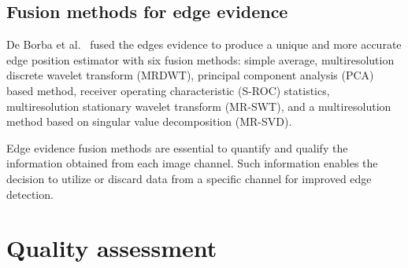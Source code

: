 \documentclass{article}
\begin{document}
\subsection{Fusion methods for edge evidence}
De Borba et al.~\cite{DeBorba2020,FeatureSelectionforEdgeDetectioninPolSARImages} fused the edges evidence to produce a unique and more accurate edge position estimator with six fusion methods: simple average, multiresolution discrete wavelet transform (MRDWT), principal component analysis (PCA) based method, receiver operating characteristic (S-ROC) statistics, multiresolution stationary wavelet transform (MR-SWT), and a multiresolution method based on singular value decomposition (MR-SVD).

Edge evidence fusion methods are essential to quantify and qualify the information obtained from each image channel. 
Such information enables the decision to utilize or discard data from a specific channel for improved edge detection.

\section{Quality assessment}\label{sec_3}
\end{document}

